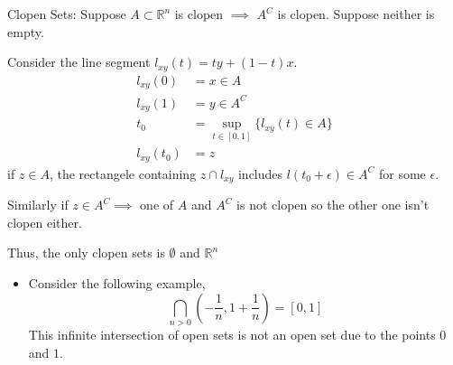 \documentclass[a4paper]{article}
\numberwithin{equation}{section}
\newcommand{\R}{\mathbb{R}}
\begin{document}
\begin{definition}
Clopen Sets:
    Suppose $A\subset\R^n$ is clopen $\implies$ $A^C$ is clopen. Suppose neither is empty. 

    Consider the line segment $l_{xy}(t)=ty+(1-t)x$.
    \begin{align}
        l_{xy}(0)&=x\in A\\
        l_{xy}(1)&=y\in A^C\\
        t_0&=\sup_{t\in[0,1]}\{l_{xy}(t)\in A\}\\
        l_{xy}(t_0)&=z
    \end{align}
    if $z\in A$, the rectangele containing $z\cap l_{xy}$ includes $l(t_0+\epsilon)\in A^C$ for some $\epsilon$.

    Similarly if $z\in A^C\implies$ one of $A$ and $A^C$ is not clopen so the other one isn't clopen either. 

    Thus, the only clopen sets is $\emptyset$ and $\R^n$
\end{definition}
\begin{itemize}
    \item Consider the following example,
    \begin{equation}
        \bigcap_{n>0}\left(-\frac{1}{n},1+\frac{1}{n}\right)=[0,1]
    \end{equation}
    This infinite intersection of open sets is not an open set due to the points $0$ and $1$.
\end{itemize}
\end{document}
